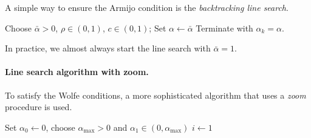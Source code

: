 A simple way to ensure the Armijo condition is the \emph{backtracking line search}.

\begin{algorithm}[H]
\caption{Line search with backtracking}
\label{alg:backtracking}
Choose $\bar{\alpha} > 0$, $\rho \in (0,1)$, $c \in (0,1)$; Set $\alpha \leftarrow \bar{\alpha}$\;
Terminate with $\alpha_k = \alpha$.
\end{algorithm}

\begin{remarque}
In practice, we almost always start the line search with $\bar{\alpha} = 1$.
\end{remarque}

\paragraph{Line search algorithm with zoom.}

To satisfy the Wolfe conditions, a more sophisticated algorithm that uses a \emph{zoom} procedure is used.

\begin{algorithm}[H]
\caption{Line search algorithm}
\label{alg:line-search}
Set $\alpha_0 \leftarrow 0$, choose $\alpha_{\max} > 0$ and $\alpha_1 \in (0, \alpha_{\max})$\;
$i \leftarrow 1$\;
\end{algorithm}

\begin{algorithm}[H]
\caption{Zoom procedure}
\label{alg:zoom}
\end{algorithm}

